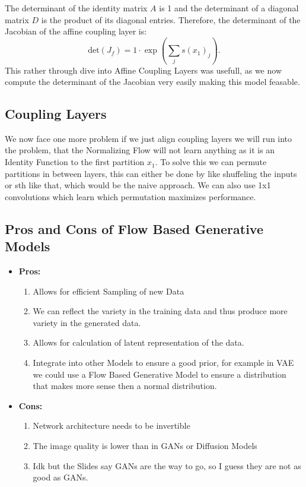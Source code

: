 \documentclass[a4paper]{article}
\begin{document}
The determinant of the identity matrix \( A \) is 1 and the determinant of a diagonal matrix \( D \) is the product of its diagonal entries. Therefore, the determinant of the Jacobian of the affine coupling layer is:
\[
\text{det}(J_f) = 1 \cdot \exp \left( \sum_j s(x_1)_j \right).
\]
This rather through dive into Affine Coupling Layers was usefull, as we now compute the determinant of the Jacobian very easily making this model feasable. 

\subsection{Coupling Layers}
We now face one more problem if we just align coupling layers we will run into the problem, that the Normalizing Flow will not learn anything as it is an Identity Function to the first partition $x_1$. To solve this  we can permute partitions in between layers, this can either be done by like shuffeling the inputs or sth like that, which would be the naive approach. We can also use 1x1 convolutions which learn which permutation maximizes performance.

\subsection{Pros and Cons of Flow Based Generative Models}
\begin{itemize}
    \item \textbf{Pros:}
    \begin{enumerate}
        \item Allows for efficient Sampling of new Data 
        \item We can reflect the variety in the training data and thus produce more variety in the generated data.
        \item Allows for calculation of latent representation of the data.
        \item Integrate into other Models to ensure a good prior, for example in VAE we could use a Flow Based Generative Model to ensure a distribution that makes more sense then a normal distribution.
    \end{enumerate}
    \item \textbf{Cons:}
     \begin{enumerate}
        \item Network architecture needs to be invertible
        \item The image quality is lower than in GANs or Diffusion Models
        \item Idk but the Slides say GANs are the way to go, so I guess they are not as good as GANs.
        \end{enumerate}
        
\end{itemize}
\newpage
\end{document}
